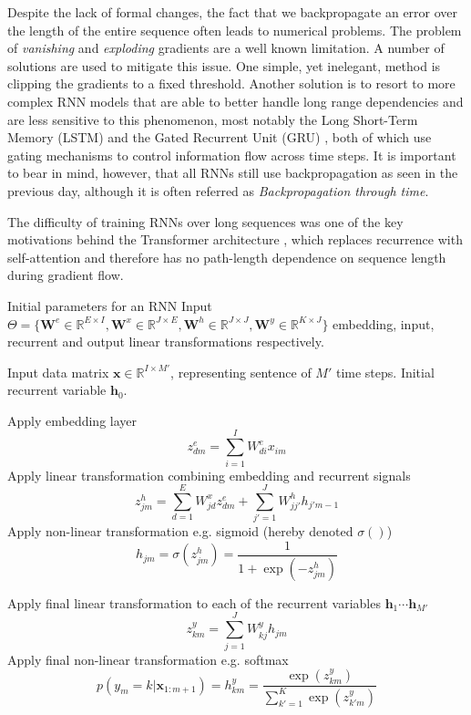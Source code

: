 Despite the lack of formal changes, the fact that we backpropagate an error
over the length of the entire sequence often leads to numerical problems. The
problem of \textit{vanishing} and \textit{exploding} gradients are a well known
limitation. A number of solutions are used to mitigate this issue. One simple,
yet inelegant, method is clipping the gradients to a fixed threshold. Another
solution is to resort to more complex RNN models that are able to better handle
long range dependencies and are less sensitive to this phenomenon, most notably
the Long Short-Term Memory (LSTM) \citep{hochreiter1997long} and the Gated
Recurrent Unit (GRU) \citep{cho2014learning}, both of which use gating
mechanisms to control information flow across time steps. It is
important to bear in mind, however, that all RNNs still use backpropagation as
seen in the previous day, although it is often referred as
\textit{Backpropagation through time}.

The difficulty of training RNNs over long sequences was one of the key
motivations behind the Transformer architecture \citep{vaswani2017attention},
which replaces recurrence with self-attention and therefore has no path-length
dependence on sequence length during gradient flow.

\begin{algorithm}[th!]
   \caption{Forward pass of a Recurrent Neural Network (RNN) with embeddings}
\begin{algorithmic}[1]
\label{algo:rnnforward}

    Initial parameters for an RNN Input
$\Theta=\{\mathbf{W}^e \in \mathbb{R}^{E \times I}, \mathbf{W}^x \in \mathbb{R}^{J \times E}, \mathbf{W}^h \in \mathbb{R}^{J \times J}, \mathbf{W}^y \in \mathbb{R}^{K \times J} \}$ embedding, input, recurrent and output linear transformations respectively.

    Input data matrix $\mathbf{x} \in \mathbb{R}^{I \times M'}$, representing sentence of $M'$ time steps. Initial recurrent variable $\mathbf{h}_0$. 

        \STATE Apply embedding layer
        $$z_{dm}^e = \sum_{i=1}^{I} W^e_{di} x_{im}$$
     \STATE Apply linear transformation combining embedding and recurrent signals
        $$z_{jm}^h = \sum_{d=1}^{E} W_{jd}^x z_{dm}^e + \sum_{j'=1}^{J} W_{jj'}^h h_{j'm-1}$$
     \STATE Apply non-linear transformation e.g. sigmoid (hereby denoted $\sigma()$)
        $$h_{jm} = \sigma(z_{jm}^h)  = \frac{1}{1+\exp(-z_{jm}^h)}$$

	\ENDFOR

        \STATE Apply final linear transformation to each of the recurrent variables $\mathbf{h}_1 \cdots \mathbf{h}_{M'}$ 
$$z_{km}^y = \sum_{j=1}^{J} W_{kj}^y h_{jm}$$
\STATE Apply final non-linear transformation e.g. softmax 
   $$p(y_m=k|\mathbf{x}_{1:m+1}) = h_{km}^y  = \frac{\exp(z_{km}^y)}{\sum_{k'=1}^{K} \exp(z_{k'm}^y)}$$
\end{algorithmic}
\end{algorithm}


